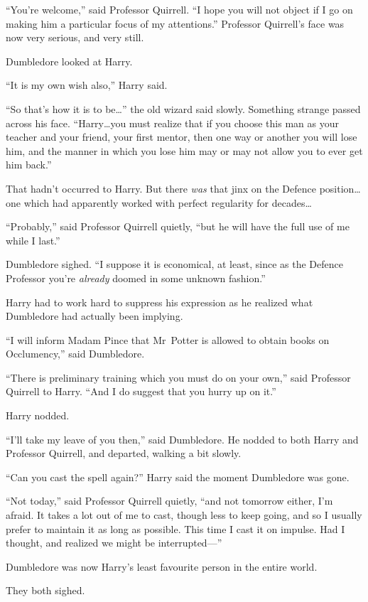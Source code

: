 “You’re welcome,” said Professor Quirrell. “I hope you will not object if I go on making him a particular focus of my attentions.” Professor Quirrell’s face was now very serious, and very still.

Dumbledore looked at Harry.

“It is my own wish also,” Harry said.

“So that’s how it is to be…” the old wizard said slowly. Something strange passed across his face. “Harry…you must realize that if you choose this man as your teacher and your friend, your first mentor, then one way or another you will lose him, and the manner in which you lose him may or may not allow you to ever get him back.”

That hadn’t occurred to Harry. But there \emph{was} that jinx on the Defence position…one which had apparently worked with perfect regularity for decades…

“Probably,” said Professor Quirrell quietly, “but he will have the full use of me while I last.”

Dumbledore sighed. “I suppose it is economical, at least, since as the Defence Professor you’re \emph{already} doomed in some unknown fashion.”

Harry had to work hard to suppress his expression as he realized what Dumbledore had actually been implying.

“I will inform Madam Pince that Mr~Potter is allowed to obtain books on Occlumency,” said Dumbledore.

“There is preliminary training which you must do on your own,” said Professor Quirrell to Harry. “And I do suggest that you hurry up on it.”

Harry nodded.

“I’ll take my leave of you then,” said Dumbledore. He nodded to both Harry and Professor Quirrell, and departed, walking a bit slowly.

“Can you cast the spell again?” Harry said the moment Dumbledore was gone.

“Not today,” said Professor Quirrell quietly, “and not tomorrow either, I’m afraid. It takes a lot out of me to cast, though less to keep going, and so I usually prefer to maintain it as long as possible. This time I cast it on impulse. Had I thought, and realized we might be interrupted—”

Dumbledore was now Harry’s least favourite person in the entire world.

They both sighed.

